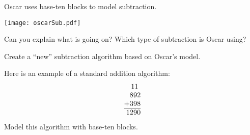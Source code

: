 \documentclass{ximera}
\begin{document}
\newpage
{}
\begin{problem}
Oscar uses base-ten blocks to model subtraction.  
\begin{image}
\texttt{[image: oscarSub.pdf]}
\end{image}
Can you explain what is going on?  Which type of subtraction is Oscar using?  
\end{problem}

\begin{problem} Create a ``new'' subtraction algorithm based on Oscar's model.
\end{problem}

\newpage
\begin{problem}
Here is an example of a standard addition algorithm:
\[
\begin{tabular}{@{}r@{}}
11~~\\
892\\
+398\\ \hline
1290
\end{tabular}
\]
Model this algorithm with base-ten blocks.
\end{problem}
\end{document}
